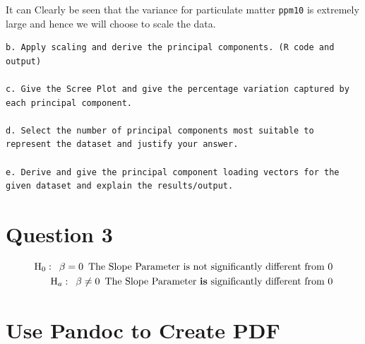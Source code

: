 \documentclass[
]{article}
\newcommand{\passthrough}[1]{#1}
\begin{document}
It can Clearly be seen that the variance for particulate matter
\passthrough{\lstinline!ppm10!} is extremely large and hence we will
choose to scale the data.

\begin{lstlisting}
b. Apply scaling and derive the principal components. (R code and output)

c. Give the Scree Plot and give the percentage variation captured by each principal component.

d. Select the number of principal components most suitable to represent the dataset and justify your answer.

e. Derive and give the principal component loading vectors for the given dataset and explain the results/output.
\end{lstlisting}

\hypertarget{question-3}{%
\section{Question 3}\label{question-3}}

\[
\begin{align}
\text{H}_0: \enspace \beta = 0 \enspace \text{The Slope Parameter is not significantly different from 0} \\
\text{H}_a: \enspace \beta \neq 0 \enspace \text{The Slope Parameter \textbf{is} significantly different from 0} 
\end{align}
\]

\hypertarget{use-pandoc-to-create-pdf}{%
\section{Use Pandoc to Create PDF}\label{use-pandoc-to-create-pdf}}
\end{document}
